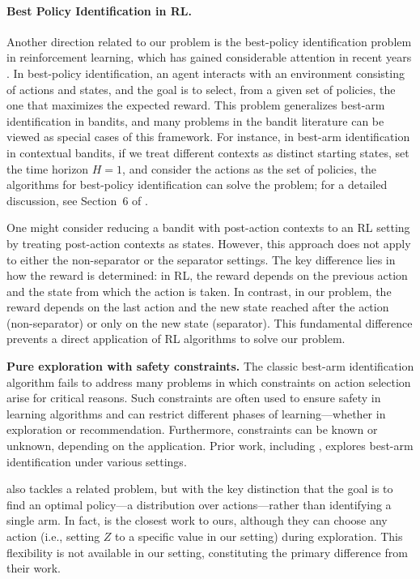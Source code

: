 \paragraph{Best Policy Identification in RL.}
Another direction related to our problem is the best-policy identification problem in reinforcement learning, which has gained considerable attention in recent years \cite{rl1-menard2021fast, rl2-al2021navigating, rl3-wagenmaker2022beyond, rl4-al2023towards}. In best-policy identification, an agent interacts with an environment consisting of actions and states, and the goal is to select, from a given set of policies, the one that maximizes the expected reward. This problem generalizes best-arm identification in bandits, and many problems in the bandit literature can be viewed as special cases of this framework. For instance, in best-arm identification in contextual bandits, if we treat different contexts as distinct starting states, set the time horizon $H=1$, and consider the actions as the set of policies, the algorithms for best-policy identification can solve the problem; for a detailed discussion, see Section~6 of \cite{rl-difference-estimation-narang2024sample}.


One might consider reducing a bandit with post-action contexts to an RL setting by treating post-action contexts as states. However, this approach does not apply to either the non-separator or the separator settings. The key difference lies in how the reward is determined: in RL, the reward depends on the previous action and the state from which the action is taken. In contrast, in our problem, the reward depends on the last action and the new state reached after the action (non-separator) or only on the new state (separator). This fundamental difference prevents a direct application of RL algorithms to solve our problem.


\textbf{Pure exploration with safety constraints.} 
The classic best-arm identification algorithm fails to address many problems in which constraints on action selection arise for critical reasons. Such constraints are often used to ensure safety in learning algorithms and can restrict different phases of learning—whether in exploration or recommendation. Furthermore, constraints can be known or unknown, depending on the application. Prior work, including \cite{wang2021fairness, tang2024pure, faizal2022constrained, camilleri2022active}, explores best-arm identification under various settings.


\cite{carlsson2024pure} also tackles a related problem, but with the key distinction that the goal is to find an optimal policy—a distribution over actions—rather than identifying a single arm. In fact, \cite{carlsson2024pure} is the closest work to ours, although they can choose any action (i.e., setting $Z$ to a specific value in our setting) during exploration. This flexibility is not available in our setting, constituting the primary difference from their work.



